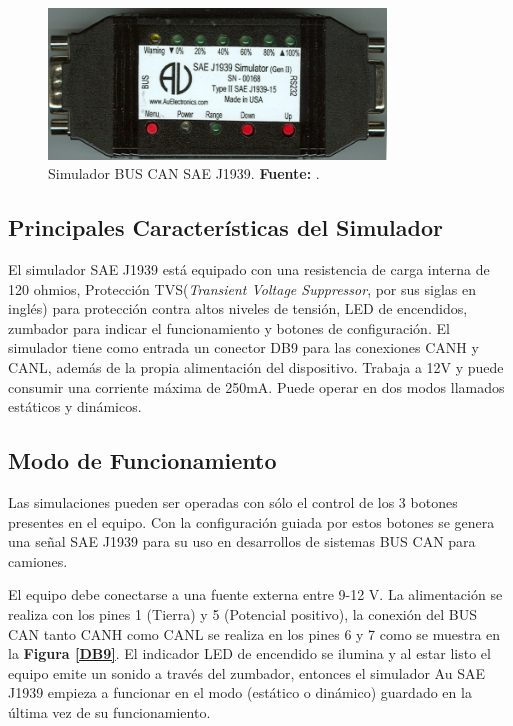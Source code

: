 \begin{figure}[H]
	\centering
		\includegraphics[width=0.8\textwidth]{./Cap6imagen/Simulador.png}
	\caption[Simulador BUS CAN SAE J1939.]{Simulador BUS CAN SAE J1939.\textbf{ Fuente:} \cite{UserM}.}
	\label{Sim} %
\end{figure}


\subsection {Principales Características del Simulador}
El simulador SAE J1939  está equipado con una resistencia de carga interna de 120 ohmios, Protección TVS(\textit{Transient Voltage Suppressor}, por sus siglas en inglés) para protección contra altos niveles de tensión, LED de encendidos, zumbador para indicar el funcionamiento y botones de configuración. 
El simulador tiene como entrada un conector DB9  para las conexiones CANH y CANL, además de la propia alimentación del dispositivo. 
Trabaja a 12V y puede consumir una corriente máxima de 250mA. 
Puede operar en dos modos llamados estáticos y dinámicos. 


\subsection{Modo de Funcionamiento}

Las simulaciones pueden ser operadas con sólo el control de los 3 botones presentes en el equipo. Con la configuración guiada por estos botones se genera una señal SAE J1939 para su uso en desarrollos de sistemas BUS CAN para camiones.

El equipo debe conectarse a una fuente externa entre 9-12 V. 
La alimentación se realiza con los pines 1 (Tierra) y 5 (Potencial positivo), la conexión del BUS CAN tanto CANH como CANL se realiza en los pines 6 y 7 como se muestra en la \textbf{Figura \ref{DB9}}.  
El indicador LED de encendido se ilumina y al estar listo el equipo emite un sonido a través del zumbador, entonces el simulador Au SAE J1939 empieza a funcionar en el modo (estático o dinámico) guardado en la última vez de su funcionamiento.

